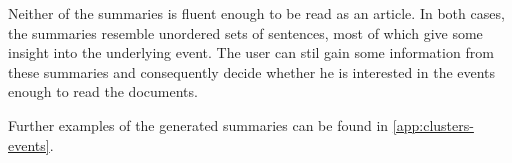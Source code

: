 \hspace{\fill}

Neither of the summaries is fluent enough to be read as an article. In both cases, the summaries resemble unordered sets of sentences, most of which give some insight into the underlying event. The user can stil gain some information from these summaries and consequently decide whether he is interested in the events enough to read the documents.

Further examples of the generated summaries can be found in \autoref{app:clusters-events}.